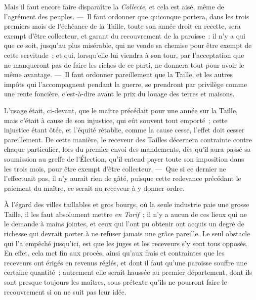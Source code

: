 \documentclass[french,twoside]{book} %
\begin{document}
Mais il faut encore faire disparaître la {\itshape Collecte}, et cela est aisé, même de l’agrément des peuples. — Il faut ordonner que quiconque portera, dans les trois premiers mois de l’échéance de la Taille, toute son année droit en recette, sera exempt d’être collecteur, et garant du recouvrement de la paroisse : il n’y a qui que ce soit, jusqu’au plus misérable, qui ne vende sa chemise pour être exempt de cette servitude ; et qui, lorsqu’elle lui viendra à son tour, par l’acceptation que ne manqueront pas de faire les riches de ce parti, ne donnera tout pour avoir le même avantage. — Il faut ordonner pareillement que la Taille, et les autres impôts qui l’accompagnent pendant la guerre, se prendront par privilège comme une rente foncière, c’est-à-dire avant le prix du louage des terres et maisons.\par
L’usage était, ci-devant, que le maître précédait pour une année sur la Taille, mais c’était à cause de son injustice, qui eût souvent tout emporté ; cette injustice étant ôtée, et l’équité rétablie, comme la cause cesse, l’effet doit cesser pareillement. De cette manière, le receveur des Tailles décernera contrainte contre chaque particulier, lors du premier envoi des mandements, dès qu’il aura passé sa soumission au greffe de l’Élection, qu’il entend payer toute son imposition dans les trois mois, pour être exempt d’être collecteur. — Que si ce dernier ne l’effectuait pas, il n’y aurait rien de gâté, puisque cette redevance précédant le paiement du maître, ce serait au receveur à y donner ordre.\par
À l’égard des villes taillables et gros bourgs, où la seule industrie paie une grosse Taille, il les faut absolument mettre {\itshape en Tarif} ; il n’y a aucun de ces lieux qui ne le demande à mains jointes, et ceux qui l’ont pu obtenir ont acquis un degré de richesse qui devrait porter à ne refuser jamais une grâce pareille. Le seul obstacle qui l’a empêché jusqu’ici, est que les juges et les receveurs s’y sont tous opposés. En effet, cela met fin aux procès, ainsi qu’aux frais et contraintes que les receveurs ont érigés en revenus réglés, et dont il faut qu’une paroisse souffre une certaine quantité ; autrement elle serait haussée au premier département, dont ils sont presque toujours les maîtres, sous prétexte qu’ils ne pourront faire le recouvrement si on ne suit pas leur idée.\par
\end{document}
